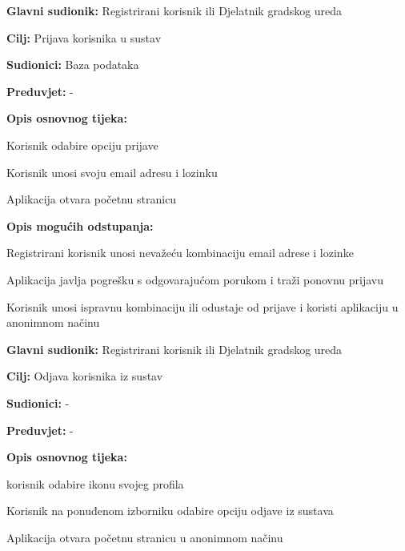 				
				\noindent {}
				\begin{packed_item}
					
					\item \textbf{Glavni sudionik:} Registrirani korisnik ili Djelatnik gradskog ureda
					\item  \textbf{Cilj:} Prijava korisnika u sustav
					\item  \textbf{Sudionici:} Baza podataka
					\item  \textbf{Preduvjet:} -
					
					\item  \textbf{Opis osnovnog tijeka:}
					\item[] \begin{packed_enum}
						\item Korisnik odabire opciju prijave
						\item Korisnik unosi svoju email adresu i lozinku
						\item Aplikacija otvara početnu stranicu
					\end{packed_enum}
					
					\item  \textbf{Opis mogućih odstupanja:}
					\item[] \begin{packed_item}
						\item[2.a] Registrirani korisnik unosi nevažeću kombinaciju email adrese i lozinke
						\item[] \begin{packed_enum}
							\item Aplikacija javlja pogrešku s odgovarajućom porukom i traži ponovnu prijavu
							\item Korisnik unosi ispravnu kombinaciju ili odustaje od prijave i koristi aplikaciju u anonimnom načinu
						\end{packed_enum}
					\end{packed_item}
				\end{packed_item}
				
				
				\noindent \underbar{\textbf{UC12 - Odjava iz sustava}}
				\begin{packed_item}
					
					\item \textbf{Glavni sudionik:} Registrirani korisnik ili Djelatnik gradskog ureda
					\item  \textbf{Cilj:} Odjava korisnika iz sustav
					\item  \textbf{Sudionici:} -
					\item  \textbf{Preduvjet:} -
					
					\item  \textbf{Opis osnovnog tijeka:}
					\item[] \begin{packed_enum}
						\item korisnik odabire ikonu svojeg profila
						\item Korisnik na ponuđenom izborniku odabire opciju odjave iz sustava
						\item Aplikacija otvara početnu stranicu u anonimnom načinu
					\end{packed_enum}
				\end{packed_item}
				
